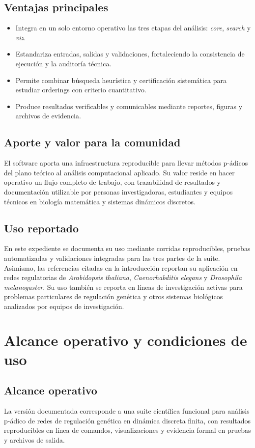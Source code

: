 \documentclass[11pt]{article}
\begin{document}
\subsection*{Ventajas principales}
\begin{itemize}
  \item Integra en un solo entorno operativo las tres etapas del análisis:
  \textit{core}, \textit{search} y \textit{viz}.
  \item Estandariza entradas, salidas y validaciones, fortaleciendo la
  consistencia de ejecución y la auditoría técnica.
  \item Permite combinar búsqueda heurística y certificación sistemática para
  estudiar orderings con criterio cuantitativo.
  \item Produce resultados verificables y comunicables mediante reportes,
  figuras y archivos de evidencia.
\end{itemize}

\subsection*{Aporte y valor para la comunidad}
El software aporta una infraestructura reproducible para llevar métodos p-ádicos
del plano teórico al análisis computacional aplicado. Su valor reside en hacer
operativo un flujo completo de trabajo, con trazabilidad de resultados y
documentación utilizable por personas investigadoras, estudiantes y equipos
técnicos en biología matemática y sistemas dinámicos discretos.

\subsection*{Uso reportado}
En este expediente se documenta su uso mediante corridas reproducibles, pruebas
automatizadas y validaciones integradas para las tres partes de la suite.
Asimismo, las referencias citadas en la introducción reportan su aplicación en
redes regulatorias de \textit{Arabidopsis thaliana}, \textit{Caenorhabditis
elegans} y \textit{Drosophila melanogaster}.
Su uso también se reporta en líneas de investigación activas para problemas
particulares de regulación genética y otros sistemas biológicos analizados por
equipos de investigación.

\section{Alcance operativo y condiciones de uso}
\subsection*{Alcance operativo}
La versión documentada corresponde a una suite científica funcional para análisis p-ádico de redes de regulación genética en dinámica discreta finita, con resultados reproducibles en línea de comandos, visualizaciones y evidencia formal en pruebas y archivos de salida.
\end{document}
